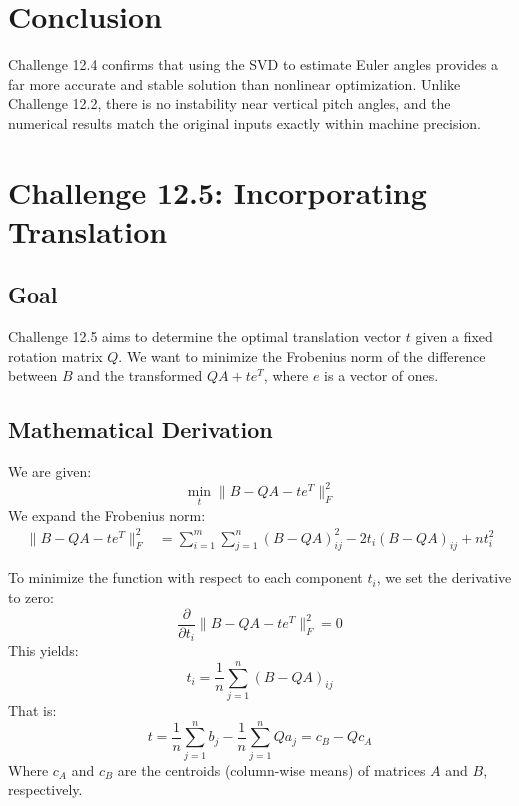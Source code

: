 \documentclass[12pt]{article}
\begin{document}
\section*{Conclusion}
Challenge 12.4 confirms that using the SVD to estimate Euler angles provides a far more accurate and stable solution than nonlinear optimization. Unlike Challenge 12.2, there is no instability near vertical pitch angles, and the numerical results match the original inputs exactly within machine precision.


\section*{Challenge 12.5: Incorporating Translation}


\subsection*{Goal}
Challenge 12.5 aims to determine the optimal translation vector \( t \) given a fixed rotation matrix \( Q \). We want to minimize the Frobenius norm of the difference between \( B \) and the transformed \( QA + te^T \), where \( e \) is a vector of ones.

\subsection*{Mathematical Derivation}
We are given:
\[
\min_t \| B - QA - te^T \|_F^2
\]
We expand the Frobenius norm:
\begin{align*}
\| B - QA - te^T \|_F^2 &= \sum_{i=1}^m \sum_{j=1}^n (B - QA)_{ij}^2 - 2t_i (B - QA)_{ij} + n t_i^2
\end{align*}

To minimize the function with respect to each component \( t_i \), we set the derivative to zero:
\[
\frac{\partial}{\partial t_i} \| B - QA - te^T \|_F^2 = 0
\]
This yields:
\[
t_i = \frac{1}{n} \sum_{j=1}^n (B - QA)_{ij}
\]
That is:
\[
t = \frac{1}{n} \sum_{j=1}^n b_j - \frac{1}{n} \sum_{j=1}^n Qa_j = c_B - Q c_A
\]
Where \( c_A \) and \( c_B \) are the centroids (column-wise means) of matrices \( A \) and \( B \), respectively.
\end{document}
